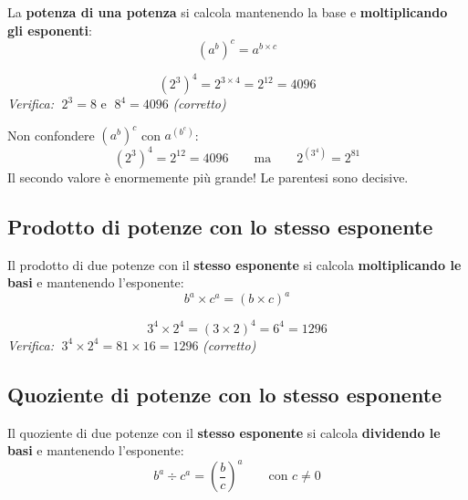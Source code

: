 \begin{regola}
  La \textbf{potenza di una potenza} si calcola mantenendo la base e
  \textbf{moltiplicando gli esponenti}:
  \[
    (a^b)^c = a^{b \times c}
  \]
\end{regola}

\begin{esempio}
  \[
    (2^3)^4 = 2^{3 \times 4} = 2^{12} = 4096
  \]
  \textit{Verifica:} $\;2^3 = 8$ e $\;8^4 = 4096$ \quad\textit{(corretto)}
\end{esempio}

\begin{attenzione}
  Non confondere $(a^b)^c$ con $a^{(b^c)}$:
  \[
    (2^3)^4 = 2^{12} = 4096 \qquad \text{ma} \qquad 2^{(3^4)} = 2^{81}
  \]
  Il secondo valore è enormemente più grande! Le parentesi sono decisive.
\end{attenzione}

\subsection{Prodotto di potenze con lo stesso esponente}

\begin{regola}
  Il prodotto di due potenze con il \textbf{stesso esponente} si calcola
  \textbf{moltiplicando le basi} e mantenendo l'esponente:
  \[
    b^a \times c^a = (b \times c)^a
  \]
\end{regola}

\begin{esempio}
  \[
    3^4 \times 2^4 = (3 \times 2)^4 = 6^4 = 1296
  \]
  \textit{Verifica:} $\;3^4 \times 2^4 = 81 \times 16 = 1296$ \quad\textit{(corretto)}
\end{esempio}

\subsection{Quoziente di potenze con lo stesso esponente}

\begin{regola}
  Il quoziente di due potenze con il \textbf{stesso esponente} si calcola
  \textbf{dividendo le basi} e mantenendo l'esponente:
  \[
    b^a \div c^a = \left(\frac{b}{c}\right)^a \qquad \text{con } c \neq 0
  \]
\end{regola}

